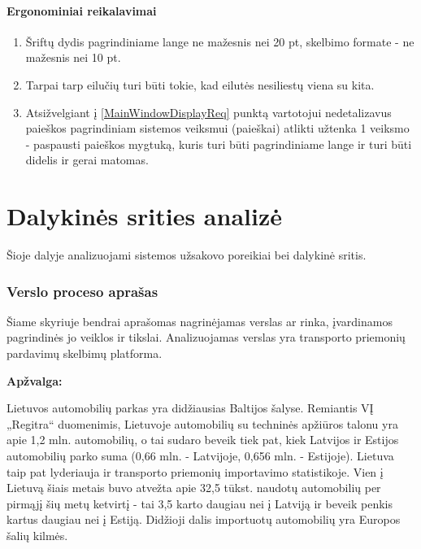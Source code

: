 \documentclass[12pt]{article}
\begin{document}
	\subsection{Ergonominiai reikalavimai}
	\begin{enumerate}[labelindent=10pt,leftmargin=2.2cm]
		\item Šriftų dydis pagrindiniame lange ne mažesnis nei 20 pt, skelbimo formate - ne mažesnis nei 10 pt.
		\item Tarpai tarp eilučių turi būti tokie, kad eilutės nesiliestų viena su kita.
		\item Atsižvelgiant į \ref{MainWindowDisplayReq} punktą vartotojui nedetalizavus paieškos pagrindiniam sistemos veiksmui (paieškai) atlikti užtenka 1 veiksmo - paspausti paieškos mygtuką, kuris turi būti pagrindiniame lange ir turi būti didelis ir gerai matomas.
	\end{enumerate}
	\pagebreak
	
	\renewcommand{\thesubsection}{\thesection.\arabic{subsection}}
	\renewcommand*{\theenumi}{\arabic{enumi}}
	\renewcommand*{\theenumii}{theenumi.\arabic{enumii}}	
	
	\part*{Dalykinės srities analizė}
	
	Šioje dalyje analizuojami sistemos užsakovo poreikiai bei dalykinė sritis.
	
	\setcounter{section}{0}
	\section{Verslo proceso aprašas}
	
	Šiame skyriuje bendrai aprašomas nagrinėjamas verslas ar rinka, įvardinamos pagrindinės jo veiklos ir tikslai. Analizuojamas verslas yra transporto priemonių pardavimų skelbimų platforma.
	
	\textbf{Apžvalga:}
	
	Lietuvos automobilių parkas yra didžiausias Baltijos šalyse. Remiantis VĮ „Regitra“ duomenimis, Lietuvoje automobilių su techninės apžiūros talonu yra apie 1,2 mln. automobilių, o tai sudaro beveik tiek pat, kiek Latvijos ir Estijos automobilių parko suma (0,66 mln. - Latvijoje, 0,656 mln. - Estijoje). Lietuva taip pat lyderiauja ir transporto priemonių importavimo statistikoje. Vien į Lietuvą šiais metais buvo atvežta apie 32,5 tūkst. naudotų automobilių per pirmąjį šių metų ketvirtį - tai 3,5 karto daugiau nei į Latviją ir beveik penkis  kartus daugiau nei į Estiją. Didžioji dalis importuotų automobilių yra Europos šalių kilmės.
\end{document}
